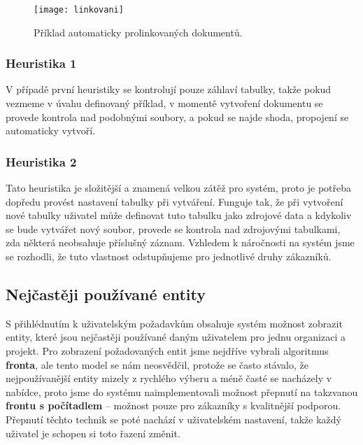\begin{figure}[htp]
\centering
\texttt{[image: linkovani]}
\caption{Příklad automaticky prolinkovaných dokumentů.}
\label{linkovani}
\end{figure}

\subsubsection{Heuristika 1}
\par V případě první heuristiky se kontrolují pouze záhlaví tabulky, takže pokud vezmeme v úvahu definovaný příklad, v momentě vytvoření dokumentu se provede kontrola nad podobnými soubory, a pokud se najde shoda, propojení se automaticky vytvoří.
\subsubsection{Heuristika 2}
\par Tato heuristika je složitější a znamená velkou zátěž pro systém, proto je potřeba dopředu provést nastavení tabulky při vytváření. Funguje tak, že při vytvoření nové tabulky uživatel může definovat tuto tabulku jako zdrojové data a kdykoliv se bude vytvářet nový soubor, provede se kontrola nad zdrojovými tabulkami, zda některá neobsahuje příslušný záznam. Vzhledem k náročnosti na systém jsme se rozhodli, že tuto vlastnost odstupňujeme pro jednotlivé druhy zákazníků.

\subsection{Nejčastěji používané entity}
\par S přihlédnutím k uživatelským požadavkům obsahuje systém možnost zobrazit entity, které jsou nejčastěji používané daným uživatelem pro jednu organizaci a projekt. Pro zobrazení požadovaných entit jsme nejdříve vybrali algoritmus \textbf{fronta}, ale tento model se nám neosvědčil, protože se často stávalo, že nejpoužívanější entity mizely z rychlého výberu a méně časté se nacházely v nabídce, proto jsme do systému naimplementovali možnost přepnutí na takzvanou \textbf{frontu s počítadlem} -- možnost pouze pro zákazníky s kvalitnější podporou. Přepnutí těchto technik se poté nachází v uživatelském nastavení, takže každý uživatel je schopen si toto řazení změnit.

